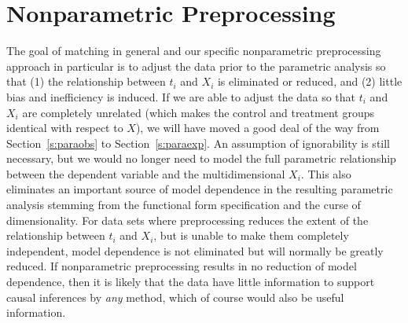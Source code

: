 \documentclass[11pt,titlepage]{article}
\begin{document}
\section{Nonparametric Preprocessing} \label{s:nonparpreproc}

The goal of matching in general and our specific nonparametric
preprocessing approach in particular is to adjust the data prior to
the parametric analysis so that (1) the relationship between $t_i$ and
$X_i$ is eliminated or reduced, and (2) little bias and inefficiency
is induced.  If we are able to adjust the data so that $t_i$ and $X_i$
are completely unrelated (which makes the control and treatment groups
identical with respect to $X$), we will have moved a good deal of the
way from Section~\ref{s:paraobs} to Section~\ref{s:paraexp}.  An
assumption of ignorability is still necessary, but we would no longer
need to model the full parametric relationship between the dependent
variable and the multidimensional $X_i$.  This also eliminates an
important source of model dependence in the resulting parametric
analysis stemming from the functional form specification and the curse
of dimensionality.  For data sets where preprocessing reduces the
extent of the relationship between $t_i$ and $X_i$, but is unable to
make them completely independent, model dependence is not eliminated
but will normally be greatly reduced.  If nonparametric preprocessing
results in no reduction of model dependence, then it is likely that
the data have little information to support causal inferences by
\emph{any} method, which of course would also be useful information.
\end{document}
